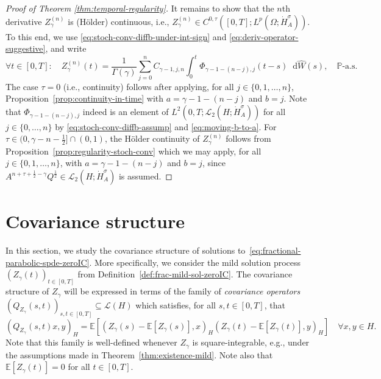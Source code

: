 \documentclass[reqno]{amsart}
\numberwithin{equation}{section}
\newcommand{\bbP}{\mathbb{P}}
\newcommand{\E}{\mathbb{E}}
\newcommand{\rd}{\mathop{}\!\mathrm{d}}
\theoremstyle{remark}
\theoremstyle{definition}
\begin{document}
\begin{proof}[Proof of Theorem \ref{thm:temporal-regularity}]
	It remains to show that the $n$th derivative 
	$Z_\gamma^{(n)}$  
	is (H\"older) continuous, i.e., 
	$Z_\gamma^{(n)} \in C^{0,\tau}([0,T]; L^p(\Omega; \dot H_A^\sigma))$. 
	To this end, we use \eqref{eq:stoch-conv-diffb-under-int-sign} 
	and \eqref{eq:deriv-operator-suggestive},  and write
	\[ 
	\forall t\in [0,T]: 
	\quad 
	Z_\gamma^{(n)}(t) 
	= 
	\frac{1}{\Gamma(\gamma)}
	\sum_{j=0}^n 
	C_{\gamma-1,j,n} \int_0^t \Phi_{\gamma-1-(n-j),j}(t-s) \rd \widehat{W}(s), 
	\quad 
	\bbP\text{-a.s.} 
	\]  
	The case $\tau=0$ 
	(i.e., continuity) follows after applying, 
	for all $j \in \{0,1,\ldots,n\}$, 
	Proposition~\ref{prop:continuity-in-time} 
	with $a=\gamma-1-(n-j)$ and $b = j$.
	Note that  
	$\Phi_{\gamma-1-(n-j),j}$ indeed 
	is an element of 
	$L^2(0,T;\mathscr L_2(H;\dot H_A^\sigma))$ 
	for all $j \in \{0,\ldots,n\}$ by \eqref{eq:stoch-conv-diffb-assump} 
	and \eqref{eq:moving-b-to-a}. 
	For $\tau \in \bigl(0,\gamma-n-\frac{1}{2}\bigr] \cap (0,1)$, 
	the H\"older continuity of 
	$Z_\gamma^{(n)}$ follows from 
	Proposition~\ref{prop:regularity-stoch-conv} 
	which we may apply, for all $j \in \{0,1,\ldots,n\}$, 
	with $a=\gamma-1-(n-j)$ and $b = j$,  
	since 
	$ A^{n+\tau+\frac{1}{2}-\gamma} Q^{\frac{1}{2}} \in \mathscr L_2(H;\dot H_A^\sigma)$ 
	is assumed. 
\end{proof}


\section{Covariance structure}
\label{sec:covariance-structure}

In this section, we study the covariance 
structure of solutions 
to~\eqref{eq:fractional-parabolic-spde-zeroIC}. 
More specifically, 
we consider the mild solution process
$(Z_\gamma(t))_{t\in[0,T]}$ 
from Definition~\ref{def:frac-mild-sol-zeroIC}.
The covariance structure
of $Z_\gamma$ will be expressed in terms
of the family of 
\emph{covariance operators} 
$(Q_{Z_\gamma}(s,t))_{s,t\in [0,T]} \subseteq \mathscr L(H)$  
which satisfies, for all $s,t\in[0,T]$, that 
% 
\[ 
( Q_{Z_\gamma}(s,t) x, y)_H   
= 
\E[ (Z_\gamma(s)-\E[Z_\gamma(s)], x)_H( Z_\gamma(t)-\E[Z_\gamma(t)], y)_H ] 
\quad 
\forall x,y\in H. 
\] 
%
Note that this family is well-defined  
whenever $Z_\gamma$ is square-integrable, e.g., 
under the assumptions made in Theorem~\ref{thm:existence-mild}. 
Note also that $\E[Z_\gamma(t)] = 0$ 
for all $t\in [0,T]$. 
%
\end{document}
